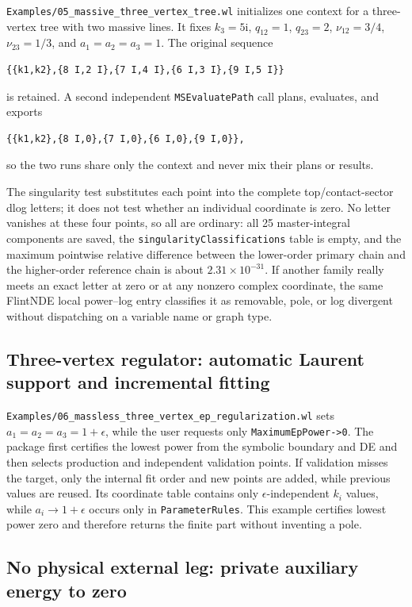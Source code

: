 \documentclass[11pt,a4paper]{article}
\newcommand{\ii}{\mathrm i}
\begin{document}
\texttt{Examples/05\_massive\_three\_vertex\_tree.wl} initializes one context for a three-vertex
tree with two massive lines. It fixes $k_3=5\ii$, $q_{12}=1$, $q_{23}=2$,
$\nu_{12}=3/4$, $\nu_{23}=1/3$, and $a_1=a_2=a_3=1$. The original sequence
\begin{verbatim}
{{k1,k2},{8 I,2 I},{7 I,4 I},{6 I,3 I},{9 I,5 I}}
\end{verbatim}
is retained. A second independent \texttt{MSEvaluatePath} call plans, evaluates, and exports
\begin{verbatim}
{{k1,k2},{8 I,0},{7 I,0},{6 I,0},{9 I,0}},
\end{verbatim}
so the two runs share only the context and never mix their plans or results.

The singularity test substitutes each point into the complete top/contact-sector dlog letters; it
does not test whether an individual coordinate is zero. No letter vanishes at these four points,
so all are ordinary: all 25 master-integral components are saved, the
\texttt{singularityClassifications} table is empty, and the maximum pointwise relative difference
between the lower-order primary chain and the higher-order reference chain is about
$2.31\times10^{-31}$. If another family really meets an exact letter at zero or at any nonzero
complex coordinate, the same FlintNDE local power--log entry classifies it as removable, pole, or
log divergent without dispatching on a variable name or graph type.

\subsection{Three-vertex regulator: automatic Laurent support and incremental fitting}

\texttt{Examples/06\_massless\_three\_vertex\_ep\_regularization.wl} sets
$a_1=a_2=a_3=1+\epsilon$, while the user requests only \texttt{MaximumEpPower->0}. The package first
certifies the lowest power from the symbolic boundary and DE and then selects production and
independent validation points. If validation misses the target, only the internal fit order and new
points are added, while previous values are reused. Its coordinate table contains only
$\epsilon$-independent $k_i$ values, while $a_i\to1+\epsilon$ occurs only in
\texttt{ParameterRules}. This example certifies lowest power zero and therefore returns the finite
part without inventing a pole.

\subsection{No physical external leg: private auxiliary energy to zero}
\end{document}
